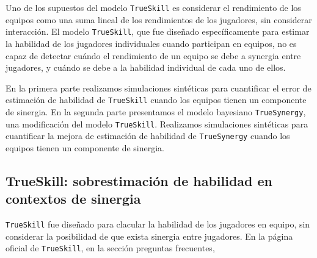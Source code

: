 \documentclass[a4paper,11pt]{book}
\theoremstyle{definition}
\begin{document}
Uno de los supuestos del modelo \texttt{TrueSkill} es considerar el rendimiento de los equipos como una suma lineal de los rendimientos de los jugadores, sin considerar interacci\'on.
%
El modelo \texttt{TrueSkill}, que fue dise\~nado espec\'ificamente para estimar la habilidad de los jugadores individuales cuando participan en equipos, no es capaz de detectar cu\'ando el rendimiento de un equipo se debe a synergia entre jugadores, y cu\'ando se debe a la habilidad individual de cada uno de ellos.

\vspace{0.3cm}

En la primera parte realizamos simulaciones sint\'eticas para cuantificar el error de estimaci\'on de habilidad de \texttt{TrueSkill} cuando los equipos tienen un componente de sinergia.
En la segunda parte presentamos el modelo bayesiano \texttt{TrueSynergy}, una modificaci\'on del modelo \texttt{TrueSkill}.
Realizamos simulaciones sint\'eticas para cuantificar la mejora de estimaci\'on de habilidad de \texttt{TrueSynergy} cuando los equipos tienen un componente de sinergia.

\subsection{TrueSkill: sobrestimaci\'on de habilidad en contextos de sinergia}

\texttt{TrueSkill} fue dise\~nado para clacular la habilidad de los jugadores en equipo, sin considerar la posibilidad de que exista sinergia entre jugadores.
En la p\'agina oficial de \texttt{TrueSkill}, en la secci\'on preguntas frecuentes,
\end{document}
